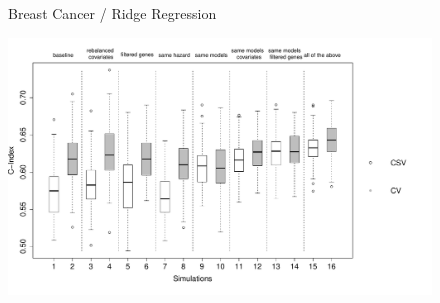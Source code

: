 \documentclass{article}
\begin{document}
  \begin{figure}[H]
		\centering            
        	\centerline{Breast Cancer / Ridge Regression}
            \includegraphics[width=16cm]{boxplot_breast_ridge_allpanels.pdf}
   \end{figure}
   
\end{document}
